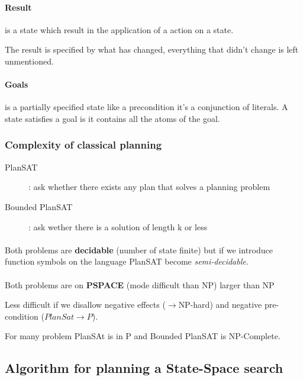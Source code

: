 \paragraph{\textbf{Result}} is a state which result in the application of a action on a state.

The result is specified by what has changed, everything that didn't change is left unmentioned.


\paragraph{\textbf{Goals}} is a partially specified state like a precondition it's
a conjunction of literals.
A state satisfies a goal is it contains all the atoms of the goal.


\subsubsection{Complexity of classical planning}
\begin{description}
    \item[PlanSAT] : ask whether there exists any plan that solves a planning problem
    \item[Bounded PlanSAT] : ask wether there is a solution of length k or less
\end{description}

\paragraph{ } Both problems are \textbf{decidable} (number of state finite) but if we  
introduce function symbols on the language PlanSAT become \textit{semi-decidable}.

\paragraph{ } Both problems are on \textbf{PSPACE} (mode difficult than NP) larger than NP

Less difficult if we disallow negative effects ($\to $NP-hard) and negative
pre-condition ($PlanSat \to P$).

For many problem PlanSAt is in P and Bounded PlanSAT is NP-Complete.

\subsection{Algorithm for planning a State-Space search}

